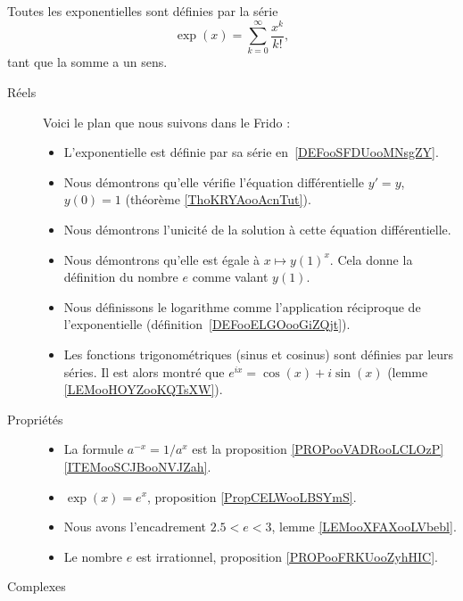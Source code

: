         \label{THEMEooKXSGooCsQNoY}

Toutes les exponentielles sont définies par la série
\begin{equation*}
	\exp(x)=\sum_{k=0}^{\infty}\frac{ x^k }{ k! },
\end{equation*}
tant que la somme a un sens.

\begin{description}
	\item[Réels]

		Voici le plan que nous suivons dans le Frido :
		\begin{itemize}
			\item L'exponentielle est définie par sa série en~\ref{DEFooSFDUooMNsgZY}.
			\item Nous démontrons qu'elle vérifie l'équation différentielle \( y'=y\), \( y(0)=1\) (théorème \ref{ThoKRYAooAcnTut}).
			\item Nous démontrons l'unicité de la solution à cette équation différentielle.
			\item Nous démontrons qu'elle est égale à \( x\mapsto y(1)^x\). Cela donne la définition du nombre \( e\) comme valant \( y(1)\).
			\item Nous définissons le logarithme comme l'application réciproque de l'exponentielle (définition~\ref{DEFooELGOooGiZQjt}).
			\item Les fonctions trigonométriques (sinus et cosinus) sont définies par leurs séries. Il est alors montré que \( e^{ix}=\cos(x)+i\sin(x)\) (lemme \ref{LEMooHOYZooKQTsXW}).
		\end{itemize}

		\item[Propriétés]\hspace{1cm}
		\begin{itemize}
			\item
			      La formule \( a^{-x}=1/a^x\) est la proposition \ref{PROPooVADRooLCLOzP}\ref{ITEMooSCJBooNVJZah}.
			\item
			      \( \exp(x)= e^{x}\), proposition \ref{PropCELWooLBSYmS}.
			\item
			      Nous avons l'encadrement \( 2.5 < e < 3\), lemme \ref{LEMooXFAXooLVbebl}.
			\item
			      Le nombre \( e\) est irrationnel, proposition \ref{PROPooFRKUooZyhHIC}.
		\end{itemize}

	\item[Complexes]


\end{description}
